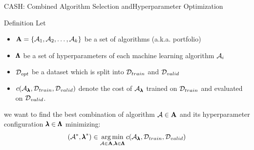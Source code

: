 \begin{frame}[c]{CASH: Combined Algorithm Selection and\newline Hyperparameter Optimization}

\begin{block}{Definition}
	Let
	\begin{itemize}
		\item \alert{$\mathbf{A} = \{\mathcal{A}_1, \mathcal{A}_2, \ldots, \mathcal{A}_k\}$ be a set of algorithms (a.k.a. portfolio)}
		\item $\pmb{\Lambda}$ be a set of hyperparameters of each machine learning algorithm $\mathcal{A}_i$
		\item $\mathcal{D}_{opt}$ be a dataset which is split into $\mathcal{D}_{train}$ and $\mathcal{D}_{valid}$ 
		\item $c(\mathcal{A}_{\pmb{\lambda}}, \mathcal{D}_{train}, \mathcal{D}_{valid})$ denote the cost of $\mathcal{A}_{\pmb{\lambda}}$ trained on $\mathcal{D}_{train}$ and evaluated on $\mathcal{D}_{valid}$.
	\end{itemize}
	we want to find \alert{the best combination of algorithm $\mathcal{A} \in \mathbf{A}$ and its hyperparameter configuration $\pmb{\lambda} \in \pmb{\Lambda}$} minimizing:
	\begin{equation}
	(\mathcal{A}^*, {\pmb{\lambda}}^*) \in \operatorname*{arg\,min}_{\mathcal{A} \in \mathbf{A}, \pmb{\lambda} \in \pmb{\Lambda}} c(\mathcal{A}_{\pmb{\lambda}}, \mathcal{D}_{train}, \mathcal{D}_{valid}) \nonumber
	\end{equation}
\end{block}

\end{frame}
